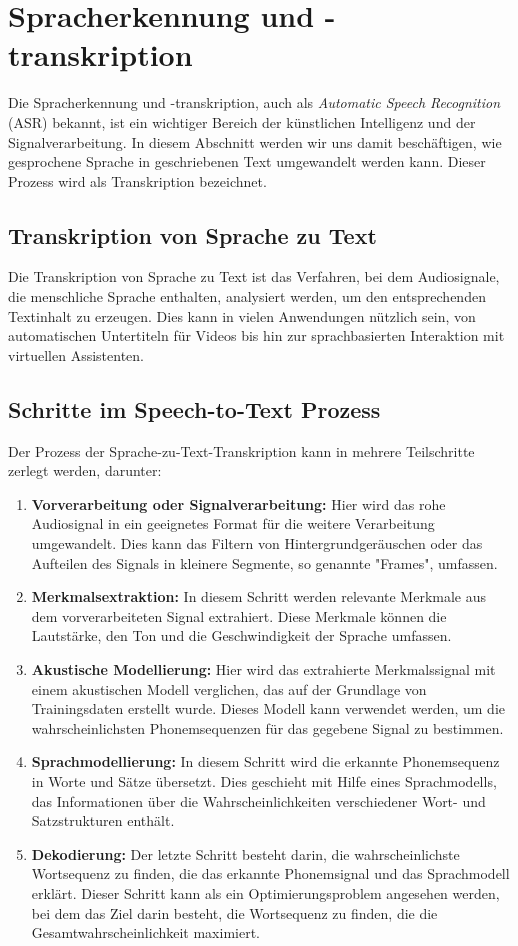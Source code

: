 \documentclass[12pt,a4paper]{article}
\begin{document}
\newpage


\section{Spracherkennung und -transkription}
Die Spracherkennung und -transkription, auch als \textit{Automatic Speech Recognition} (ASR) bekannt, ist ein wichtiger Bereich der künstlichen Intelligenz und der Signalverarbeitung. In diesem Abschnitt werden wir uns damit beschäftigen, wie gesprochene Sprache in geschriebenen Text umgewandelt werden kann. Dieser Prozess wird als Transkription bezeichnet.
\subsection{Transkription von Sprache zu Text}
Die Transkription von Sprache zu Text ist das Verfahren, bei dem Audiosignale, die menschliche Sprache enthalten, analysiert werden, um den entsprechenden Textinhalt zu erzeugen. Dies kann in vielen Anwendungen nützlich sein, von automatischen Untertiteln für Videos bis hin zur sprachbasierten Interaktion mit virtuellen Assistenten.

\subsection{Schritte im Speech-to-Text Prozess}

Der Prozess der Sprache-zu-Text-Transkription kann in mehrere Teilschritte zerlegt werden, darunter:

\begin{enumerate}
	\item \textbf{Vorverarbeitung oder Signalverarbeitung:} Hier wird das rohe Audiosignal in ein geeignetes Format für die weitere Verarbeitung umgewandelt. Dies kann das Filtern von Hintergrundgeräuschen oder das Aufteilen des Signals in kleinere Segmente, so genannte "Frames", umfassen.
	\item \textbf{Merkmalsextraktion:} In diesem Schritt werden relevante Merkmale aus dem vorverarbeiteten Signal extrahiert. Diese Merkmale können die Lautstärke, den Ton und die Geschwindigkeit der Sprache umfassen. 
	\item \textbf{Akustische Modellierung:} Hier wird das extrahierte Merkmalssignal mit einem akustischen Modell verglichen, das auf der Grundlage von Trainingsdaten erstellt wurde. Dieses Modell kann verwendet werden, um die wahrscheinlichsten Phonemsequenzen für das gegebene Signal zu bestimmen.
	\item \textbf{Sprachmodellierung:} In diesem Schritt wird die erkannte Phonemsequenz in Worte und Sätze übersetzt. Dies geschieht mit Hilfe eines Sprachmodells, das Informationen über die Wahrscheinlichkeiten verschiedener Wort- und Satzstrukturen enthält.
	\item \textbf{Dekodierung:} Der letzte Schritt besteht darin, die wahrscheinlichste Wortsequenz zu finden, die das erkannte Phonemsignal und das Sprachmodell erklärt. Dieser Schritt kann als ein Optimierungsproblem angesehen werden, bei dem das Ziel darin besteht, die Wortsequenz zu finden, die die Gesamtwahrscheinlichkeit maximiert.
\end{enumerate}
\end{document}
